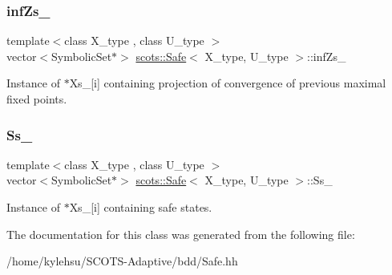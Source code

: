 \subsubsection{\texorpdfstring{inf\+Zs\+\_\+}{infZs\_}}
{\footnotesize\ttfamily template$<$class X\+\_\+type , class U\+\_\+type $>$ \\
vector$<$Symbolic\+Set$\ast$$>$ \hyperlink{classscots_1_1Safe}{scots\+::\+Safe}$<$ X\+\_\+type, U\+\_\+type $>$\+::inf\+Zs\+\_\+}

Instance of $\ast$\+Xs\+\_\+\mbox{[}i\mbox{]} containing projection of convergence of previous maximal fixed points. \mbox{\label{classscots_1_1Safe_a4c272a1e134f26e88c74a08c2703d934}} 
\subsubsection{\texorpdfstring{Ss\+\_\+}{Ss\_}}
{\footnotesize\ttfamily template$<$class X\+\_\+type , class U\+\_\+type $>$ \\
vector$<$Symbolic\+Set$\ast$$>$ \hyperlink{classscots_1_1Safe}{scots\+::\+Safe}$<$ X\+\_\+type, U\+\_\+type $>$\+::Ss\+\_\+}

Instance of $\ast$\+Xs\+\_\+\mbox{[}i\mbox{]} containing safe states. 

The documentation for this class was generated from the following file\+:\begin{DoxyCompactItemize}
\item 
/home/kylehsu/\+S\+C\+O\+T\+S-\/\+Adaptive/bdd/Safe.\+hh\end{DoxyCompactItemize}

